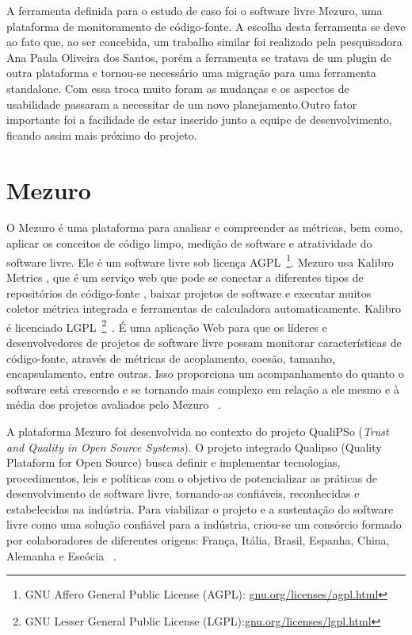 A ferramenta definida para o estudo de caso foi o software livre Mezuro, uma plataforma de monitoramento de código-fonte. A escolha desta ferramenta se deve ao fato que, ao ser concebida, um trabalho similar foi realizado pela pesquisadora Ana Paula Oliveira dos Santos, porém a ferramenta se tratava de um plugin de outra plataforma e tornou-se necessário uma migração para uma ferramenta standalone. Com essa troca muito foram as mudanças e os aspectos de usabilidade passaram a necessitar de um novo planejamento.Outro fator importante foi a facilidade de estar inserido junto a equipe de desenvolvimento, ficando assim mais próximo do projeto.

\section{Mezuro}
\label{mezuro}
O Mezuro é uma plataforma para analisar e compreender as métricas, bem como, aplicar os conceitos de código limpo, medição de software e atratividade do software livre. Ele é um software livre sob licença AGPL~\footnote{GNU Affero General Public License (AGPL): \url{gnu.org/licenses/agpl.html}}. Mezuro usa Kalibro Metrics , que é um serviço web que pode se conectar a diferentes tipos de repositórios de código-fonte , baixar projetos de software e executar muitos coletor métrica integrada e ferramentas de calculadora automaticamente. Kalibro é licenciado LGPL~\footnote{GNU Lesser General Public License (LGPL):\url{gnu.org/licenses/lgpl.html}}~\cite{mezuro2012}.
É uma aplicação Web para que os líderes e desenvolvedores de projetos de software livre possam monitorar características de código-fonte, através de métricas de acoplamento, coesão, tamanho, encapsulamento, entre outras. Isso proporciona um acompanhamento do quanto o software está crescendo e se tornando mais complexo em relação a ele mesmo e à média dos projetos avaliados pelo Mezuro~\cite{santos2012}
.

A plataforma Mezuro foi desenvolvida no contexto do projeto QualiPSo (\textit{Trust and Quality in Open Source Systems}).
O projeto integrado Qualipso (Quality Plataform for Open Source) busca definir e implementar tecnologias, procedimentos, leis e políticas com o objetivo de potencializar as práticas de desenvolvimento de software livre, tornando-as confiáveis, reconhecidas e estabelecidas na indústria.
Para viabilizar o projeto e a sustentação do software livre como uma solução confiável para a indústria, criou-se um consórcio formado por colaboradores de diferentes origens: França, Itália, Brasil, Espanha, China, Alemanha e Escócia~\cite{qualipso2013}
.

